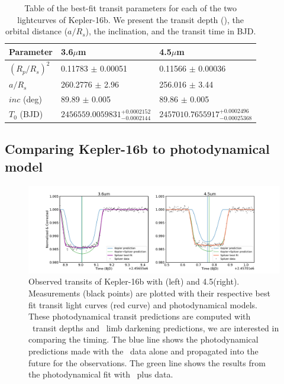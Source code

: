 \begin{table}
    \caption{Table of the best-fit transit parameters for each of the two \spitzerIRAC lightcurves of Kepler-16b. We present the transit depth (\rprss), the orbital distance ($a/R_s$), the inclination, and the transit time in BJD.}

    \centering
    \begin{tabular}{lll}
    \hline \hline
    Parameter & 3.6$\mu$m & 4.5$\mu$m \\
    \hline
    $(R_p/R_s)^2$ &  0.11783 $\pm$ 0.00051 & 0.11566 $\pm$ 0.00036 \\
    $a/R_s$ & 260.2776 $\pm$ 2.96 & 256.016 $\pm$ 3.44   \\
    $inc$ (deg)  & 89.89 $\pm$ 0.005 & 89.86 $\pm$ 0.005 \\
    $T_0$ (BJD) &  $2456559.0059831^{+0.0002152}_{-0.0002144}$ &  $2457010.7655917^{+0.0002496}_{-0.00025368}$ \\
    \hline
    \end{tabular}
    \label{P4:tab:\spitzerresults}
\end{table}

\subsection{Comparing Kepler-16b to photodynamical model}


\begin{figure}
    \centering
    \includegraphics[trim={3cm 0 3cm 0},clip, width=\linewidth]{Kepler16b_bestfit+pred+data.pdf}
    \caption{Observed transits of Kepler-16b with \um (left) and 4.5\um (right). Measurements (black points) are plotted with their respective best fit transit light curves (red curve) and photodynamical models. These photodynamical transit predictions are computed with \Kepler~transit depths and \Kepler~limb darkening predictions, we are interested in comparing the timing. The blue line shows the photodynamical predictions made with the \Kepler~data alone and propagated into the future for the \spitzer observations. The green line shows the results from the photodynamical fit with \Kepler~plus \spitzer data. }
    \label{P4:fig:K16_photo}
\end{figure}

